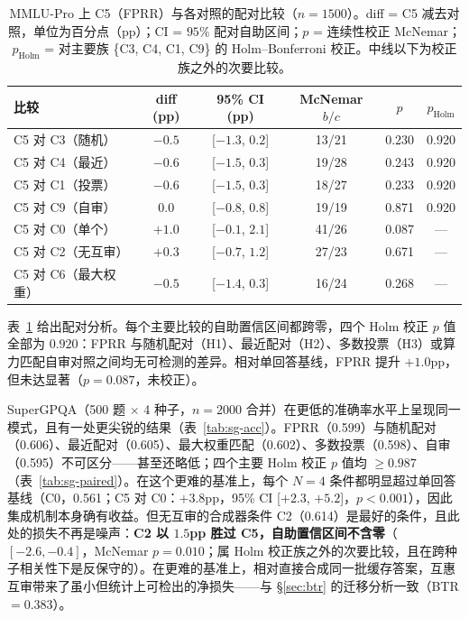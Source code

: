 \documentclass[UTF8,11pt]{ctexart}
\begin{document}
\begin{table}[t]
\centering
\small
\caption{MMLU-Pro 上 C5（FPRR）与各对照的配对比较（$n=1500$）。diff = C5 减去对照，单位为百分点（pp）；CI = $95\%$ 配对自助区间；$p$ = 连续性校正 McNemar；$p_{\mathrm{Holm}}$ = 对主要族 \{C3, C4, C1, C9\} 的 Holm--Bonferroni 校正。中线以下为校正族之外的次要比较。}
\label{tab:mmlu-paired}
\begin{tabular}{lccccc}
\toprule
比较 & diff (pp) & 95\% CI (pp) & McNemar $b/c$ & $p$ & $p_{\mathrm{Holm}}$ \\
\midrule
C5 对 C3（随机）      & $-0.5$ & [$-1.3$, $0.2$] & 13/21 & 0.230 & 0.920 \\
C5 对 C4（最近）      & $-0.6$ & [$-1.5$, $0.3$] & 19/28 & 0.243 & 0.920 \\
C5 对 C1（投票）      & $-0.6$ & [$-1.5$, $0.3$] & 18/27 & 0.233 & 0.920 \\
C5 对 C9（自审）      & $0.0$  & [$-0.8$, $0.8$] & 19/19 & 0.871 & 0.920 \\
\midrule
C5 对 C0（单个）      & $+1.0$ & [$-0.1$, $2.1$] & 41/26 & 0.087 & --- \\
C5 对 C2（无互审）    & $+0.3$ & [$-0.7$, $1.2$] & 27/23 & 0.671 & --- \\
C5 对 C6（最大权重）  & $-0.5$ & [$-1.4$, $0.3$] & 16/24 & 0.268 & --- \\
\bottomrule
\end{tabular}
\end{table}

表~\ref{tab:mmlu-paired} 给出配对分析。每个主要比较的自助置信区间都跨零，四个 Holm 校正 $p$ 值全部为 $0.920$：FPRR 与随机配对（H1）、最近配对（H2）、多数投票（H3）或算力匹配自审对照之间均无可检测的差异。相对单回答基线，FPRR 提升 $+1.0$pp，但未达显著（$p=0.087$，未校正）。

SuperGPQA（500 题 $\times$ 4 种子，$n=2000$ 合并）在更低的准确率水平上呈现同一模式，且有一处更尖锐的结果（表~\ref{tab:sg-acc}）。FPRR（0.599）与随机配对（0.606）、最近配对（0.605）、最大权重匹配（0.602）、多数投票（0.598）、自审（0.595）不可区分——甚至还略低；四个主要 Holm 校正 $p$ 值均 $\ge 0.987$（表~\ref{tab:sg-paired}）。在这个更难的基准上，每个 $N{=}4$ 条件都明显超过单回答基线（C0，0.561；C5 对 C0：$+3.8$pp，95\% CI [$+2.3$, $+5.2$]，$p<0.001$），因此集成机制本身确有收益。但无互审的合成器条件 C2（0.614）是最好的条件，且此处的损失不再是噪声：\textbf{C2 以 $1.5$pp 胜过 C5，自助置信区间不含零}（$[-2.6, -0.4]$，McNemar $p=0.010$；属 Holm 校正族之外的次要比较，且在跨种子相关性下是反保守的）。在更难的基准上，相对直接合成同一批缓存答案，互惠互审带来了虽小但统计上可检出的净损失——与 \S\ref{sec:btr} 的迁移分析一致（BTR $= 0.383$）。
\end{document}
